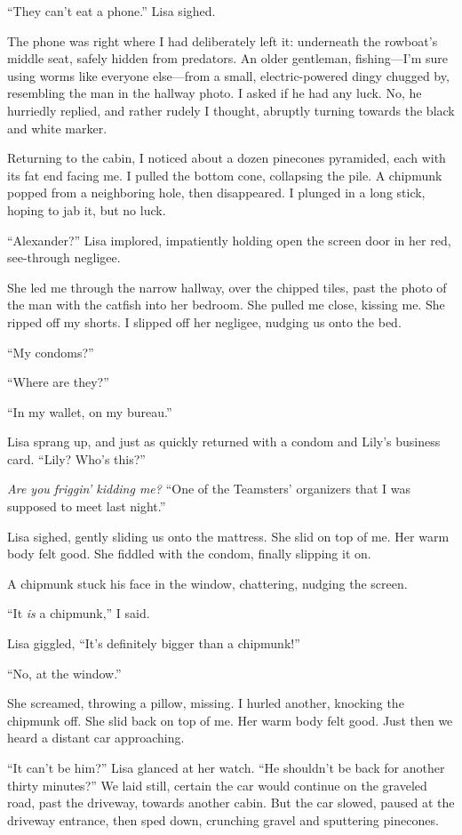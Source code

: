 ``They can't eat a phone.'' Lisa sighed.

The phone was right where I had deliberately left it: underneath the
rowboat's middle seat, safely hidden from predators. An older gentleman,
fishing---I'm sure using worms like everyone else---from a small,
electric-powered dingy chugged by, resembling the man in the hallway
photo. I asked if he had any luck. No, he hurriedly replied, and rather
rudely I thought, abruptly turning towards the black and white marker.

Returning to the cabin, I noticed about a dozen pinecones pyramided,
each with its fat end facing me. I pulled the bottom cone, collapsing
the pile. A chipmunk popped from a neighboring hole, then disappeared. I
plunged in a long stick, hoping to jab it, but no luck.

``Alexander?'' Lisa implored, impatiently holding open the screen door
in her red, see-through negligee.

She led me through the narrow hallway, over the chipped tiles, past the
photo of the man with the catfish into her bedroom. She pulled me close,
kissing me. She ripped off my shorts. I slipped off her negligee,
nudging us onto the bed.

``My condoms?''

``Where are they?''

``In my wallet, on my bureau.''

Lisa sprang up, and just as quickly returned with a condom and Lily's
business card. ``Lily? Who's this?''

\emph{Are you friggin' kidding me?} ``One of the Teamsters' organizers
that I was supposed to meet last night.''

Lisa sighed, gently sliding us onto the mattress. She slid on top of me.
Her warm body felt good. She fiddled with the condom, finally slipping
it on.

A chipmunk stuck his face in the window, chattering, nudging the screen.

``It \emph{is} a chipmunk,'' I said.

Lisa giggled, ``It's definitely bigger than a chipmunk!''

``No, at the window.''

She screamed, throwing a pillow, missing. I hurled another, knocking the
chipmunk off. She slid back on top of me. Her warm body felt good. Just
then we heard a distant car approaching.

``It can't be him?'' Lisa glanced at her watch. ``He shouldn't be back
for another thirty minutes?'' We laid still, certain the car would
continue on the graveled road, past the driveway, towards another cabin.
But the car slowed, paused at the driveway entrance, then sped down,
crunching gravel and sputtering pinecones.

